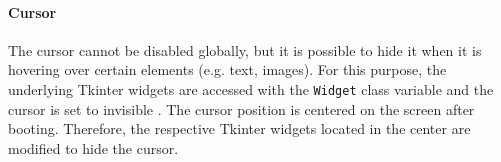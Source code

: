 \paragraph{Cursor}
The cursor cannot be disabled globally, but it is possible to hide it when it is hovering over certain elements (e.g. text, images).
For this purpose, the underlying Tkinter widgets are accessed with the \texttt{Widget} class variable and the cursor is set to invisible \cite{inf_pysimplegui_widget}.
The cursor position is centered on the screen after booting.
Therefore, the respective Tkinter widgets located in the center are modified to hide the cursor.
